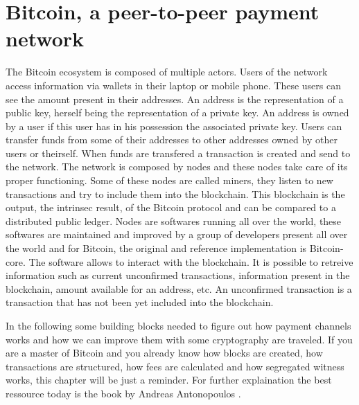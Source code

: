 \chapter{Bitcoin, a peer-to-peer payment network}
\label{chap:bitcoin}

The Bitcoin ecosystem is composed of multiple actors. Users of the network access
information via wallets in their laptop or mobile phone. These users can see the amount
present in their addresses. An address is the representation of a public key, herself
being the representation of a private key. An address is owned by a user if this user
has in his possession the associated private key. Users can transfer funds from some
of their addresses to other addresses owned by other users or theirself. When funds
are transfered a transaction is created and send to the network. The network is
composed by nodes and these nodes take care of its proper functioning. Some of these
nodes are called miners, they listen to new transactions and try to include them into
the blockchain. This blockchain is the output, the intrinsec result, of the Bitcoin
protocol and can be compared to a distributed public ledger. Nodes are softwares
running all over the world, these softwares are maintained and improved by a group
of developers present all over the world and for Bitcoin, the original and reference
implementation is Bitcoin-core. The software allows to interact with the blockchain.
It is possible to retreive information such as current unconfirmed transactions,
information present in the blockchain, amount available for an address, etc.
An unconfirmed transaction is a transaction that has not been yet included into
the blockchain.

In the following some building blocks needed to figure out how payment channels works
and how we can improve them with some cryptography are traveled. If you are a master
of Bitcoin and you already know how blocks are created, how transactions are structured,
how fees are calculated and how segregated witness works, this chapter will be just
a reminder. For further explaination the best ressource today is the book  by Andreas Antonopoulos \cite{Antonopoulos:2014:MBU:2695500}.


\minitoc

\newpage

